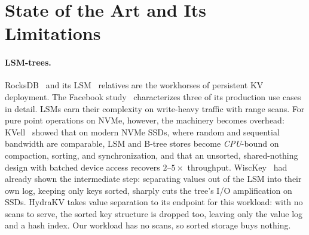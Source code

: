 \documentclass{article}
\begin{document}
\section{State of the Art and Its Limitations}
\label{sec:sota}

\paragraph{LSM-trees.} RocksDB~\cite{rocksdb} and its LSM~\cite{lsm} relatives are the workhorses of persistent KV deployment. The Facebook study~\cite{cao-fast20} characterizes three of its production use cases in detail. LSMs earn their complexity on write-heavy traffic with range scans. For pure point operations on NVMe, however, the machinery becomes overhead: KVell~\cite{kvell} showed that on modern NVMe SSDs, where random and sequential bandwidth are comparable, LSM and B-tree stores become \emph{CPU}-bound on compaction, sorting, and synchronization, and that an unsorted, shared-nothing design with batched device access recovers $2$--$5\times$ throughput. WiscKey~\cite{wisckey} had already shown the intermediate step: separating values out of the LSM into their own log, keeping only keys sorted, sharply cuts the tree's I/O amplification on SSDs. HydraKV takes value separation to its endpoint for this workload: with no scans to serve, the sorted key structure is dropped too, leaving only the value log and a hash index. Our workload has no scans, so sorted storage buys nothing.
\end{document}
